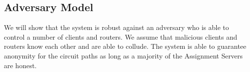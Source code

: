 \subsection{Adversary Model} We will show that the system is robust against an
adversary who is able to control a number of clients and routers. We assume
that malicious clients and routers know each other and are able to collude.
The system is able to guarantee anonymity for the circuit paths as long as a
majority of the Assignment Servers are honest.





